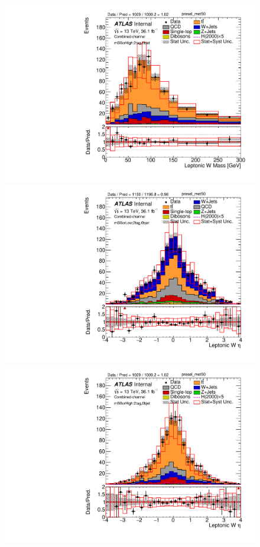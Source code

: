 \begin{figure}[!h]
\begin{center}
\includegraphics[scale=0.33]{./figures/boosted/PlotByMbbRegions/DataMC_2tag_0bjet_mbbcrHigh_lepton_presel_met50_WlepMass}                                                                           
\includegraphics[scale=0.33]{./figures/boosted/PlotByMbbRegions/DataMC_2tag_0bjet_mbbcrLow_lepton_presel_met50_WlepEta}                                                                             
\includegraphics[scale=0.33]{./figures/boosted/PlotByMbbRegions/DataMC_2tag_0bjet_mbbcrHigh_lepton_presel_met50_WlepEta}                                                                            

\end{center}
\end{figure}

